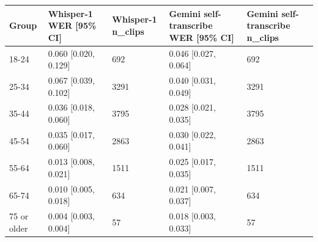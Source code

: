 \begin{tabular}{lllll}
\toprule
Group & Whisper-1 WER [95\% CI] & Whisper-1 n\_clips & Gemini self-transcribe WER [95\% CI] & Gemini self-transcribe n\_clips \\
\midrule
18-24 & 0.060 [0.020, 0.129] & 692 & 0.046 [0.027, 0.064] & 692 \\
25-34 & 0.067 [0.039, 0.102] & 3291 & 0.040 [0.031, 0.049] & 3291 \\
35-44 & 0.036 [0.018, 0.060] & 3795 & 0.028 [0.021, 0.035] & 3795 \\
45-54 & 0.035 [0.017, 0.060] & 2863 & 0.030 [0.022, 0.041] & 2863 \\
55-64 & 0.013 [0.008, 0.021] & 1511 & 0.025 [0.017, 0.035] & 1511 \\
65-74 & 0.010 [0.005, 0.018] & 634 & 0.021 [0.007, 0.037] & 634 \\
75 or older & 0.004 [0.003, 0.004] & 57 & 0.018 [0.003, 0.033] & 57 \\
\bottomrule
\end{tabular}
